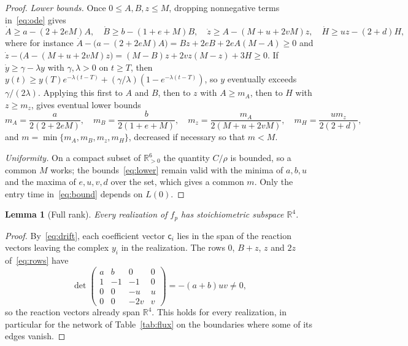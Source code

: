 \documentclass[11pt,a4paper]{article}
\theoremstyle{plain}
\newtheorem{lemma}[theorem]{Lemma}
\theoremstyle{definition}
\theoremstyle{remark}
\newcommand{\R}{\mathbb{R}}
\newcommand{\Rp}{\R_{>0}}
\newcommand{\cc}{\mathsf{c}}
\begin{document}
\begin{proof}
\emph{Lower bounds.} Once $0\le A,B,z\le M$, dropping nonnegative terms in~\eqref{eq:ode} gives
\begin{equation}\label{eq:lower}
\dot A\ge a-(2+2eM)A,\quad \dot B\ge b-(1+e+M)B,\quad \dot z\ge A-(M+u+2vM)z,\quad \dot H\ge uz-(2+d)H ,
\end{equation}
where for instance $\dot A-\bigl(a-(2+2eM)A\bigr)=Bz+2eB+2eA(M-A)\ge0$ and $\dot z-\bigl(A-(M+u+2vM)z\bigr)=(M-B)z+2vz(M-z)+3H\ge0$. If $\dot y\ge\gamma-\lambda y$ with $\gamma,\lambda>0$ on $t\ge T$, then $y(t)\ge y(T)e^{-\lambda(t-T)}+(\gamma/\lambda)(1-e^{-\lambda(t-T)})$, so $y$ eventually exceeds $\gamma/(2\lambda)$. Applying this first to $A$ and $B$, then to $z$ with $A\ge m_A$, then to $H$ with $z\ge m_z$, gives eventual lower bounds
\[
m_A=\frac a{2(2+2eM)},\quad m_B=\frac b{2(1+e+M)},\quad m_z=\frac{m_A}{2(M+u+2vM)},\quad m_H=\frac{um_z}{2(2+d)},
\]
and $m=\min\{m_A,m_B,m_z,m_H\}$, decreased if necessary so that $m<M$.

\emph{Uniformity.} On a compact subset of $\Rp^6$ the quantity $C/\rho$ is bounded, so a common $M$ works; the bounds~\eqref{eq:lower} remain valid with the minima of $a,b,u$ and the maxima of $e,u,v,d$ over the set, which gives a common $m$. Only the entry time in~\eqref{eq:bound} depends on $L(0)$.
\end{proof}

\begin{lemma}[Full rank]\label{lem:rank}
Every realization of $f_p$ has stoichiometric subspace $\R^4$.
\end{lemma}
\begin{proof}
By~\eqref{eq:drift}, each coefficient vector $\cc_i$ lies in the span of the reaction vectors leaving the complex $y_i$ in the realization. The rows $0$, $B+z$, $z$ and $2z$ of~\eqref{eq:rows} have
\[
\det\begin{pmatrix}a&b&0&0\\1&-1&-1&0\\0&0&-u&u\\0&0&-2v&v\end{pmatrix}=-(a+b)uv\ne0 ,
\]
so the reaction vectors already span $\R^4$. This holds for every realization, in particular for the network of Table~\ref{tab:flux} on the boundaries where some of its edges vanish.
\end{proof}
\end{document}
